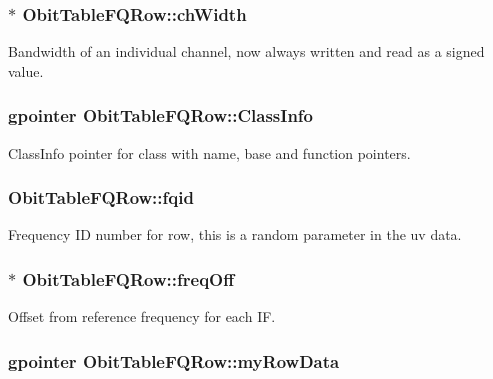 \subsubsection{$\ast$ {\bf Obit\-Table\-FQRow::ch\-Width}}\label{structObitTableFQRow_o8}


Bandwidth of an individual channel, now always written and read as a signed value. 

\subsubsection{\setlength{\rightskip}{0pt plus 5cm}gpointer {\bf Obit\-Table\-FQRow::Class\-Info}}\label{structObitTableFQRow_o1}


Class\-Info pointer for class with name, base and function pointers. 

\subsubsection{ {\bf Obit\-Table\-FQRow::fqid}}\label{structObitTableFQRow_o6}


Frequency ID number for row, this is a random parameter in the uv data. 

\subsubsection{$\ast$ {\bf Obit\-Table\-FQRow::freq\-Off}}\label{structObitTableFQRow_o7}


Offset from reference frequency for each IF. 

\subsubsection{\setlength{\rightskip}{0pt plus 5cm}gpointer {\bf Obit\-Table\-FQRow::my\-Row\-Data}}\label{structObitTableFQRow_o5}


